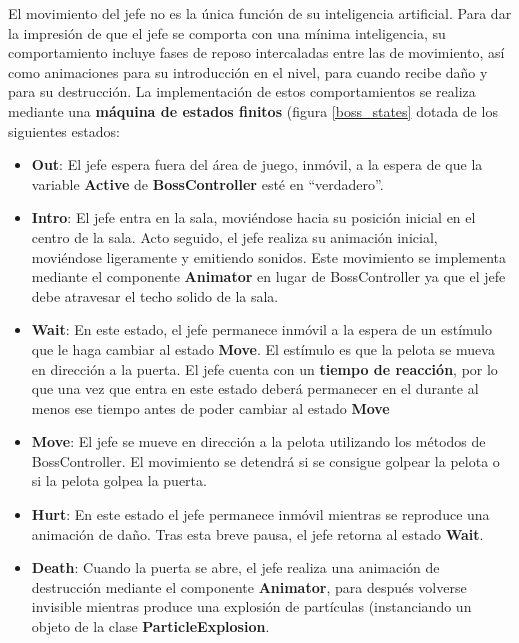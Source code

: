 El movimiento del jefe no es la única función de su inteligencia artificial. Para dar la impresión de que el jefe se comporta con una mínima inteligencia, su comportamiento incluye fases de reposo intercaladas entre las de movimiento, así como animaciones para su introducción en el nivel, para cuando recibe daño y para su destrucción. La implementación de estos comportamientos se realiza mediante una \textbf{máquina de estados finitos} (figura \ref{boss_states} dotada de los siguientes estados:
 \begin{itemize}
	\item \textbf{Out}: El jefe espera fuera del área de juego, inmóvil, a la espera de que la variable \textbf{Active} de \textbf{BossController} esté en ``verdadero''. 
	\item \textbf{Intro}: El jefe entra en la sala, moviéndose hacia su posición inicial en el centro de la sala. Acto seguido, el jefe realiza su animación inicial, moviéndose ligeramente y emitiendo sonidos. Este movimiento se implementa mediante el componente \textbf{Animator} en lugar de BossController ya que el jefe debe atravesar el techo solido de la sala.
	\item \textbf{Wait}: En este estado, el jefe permanece inmóvil a la espera de un estímulo que le haga cambiar al estado \textbf{Move}. El estímulo es que la pelota se mueva en dirección a la puerta. El jefe cuenta con un \textbf{tiempo de reacción}, por lo que una vez que entra en este estado deberá permanecer en el durante al menos ese tiempo antes de poder cambiar al estado \textbf{Move}
	\item \textbf{Move}: El jefe se mueve en dirección a la pelota utilizando los métodos de BossController. El movimiento se detendrá si se consigue golpear la pelota o si la pelota golpea la puerta. 
	\item \textbf{Hurt}: En este estado el jefe permanece inmóvil mientras se reproduce una animación de daño. Tras esta breve pausa, el jefe retorna al estado \textbf{Wait}.
	\item \textbf{Death}: Cuando la puerta se abre, el jefe realiza una animación de destrucción mediante el componente \textbf{Animator}, para después volverse invisible mientras produce una explosión de partículas (instanciando un objeto de la clase \textbf{ParticleExplosion}. 
\end{itemize}
